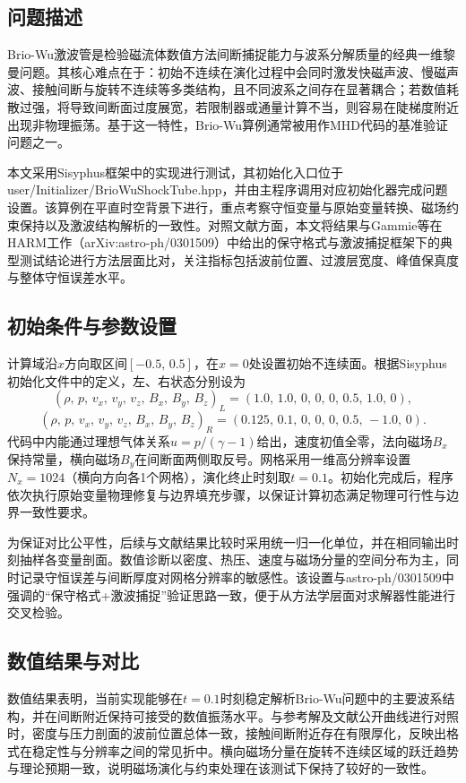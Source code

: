 \subsection{问题描述}
Brio-Wu激波管是检验磁流体数值方法间断捕捉能力与波系分解质量的经典一维黎曼问题。其核心难点在于：初始不连续在演化过程中会同时激发快磁声波、慢磁声波、接触间断与旋转不连续等多类结构，且不同波系之间存在显著耦合；若数值耗散过强，将导致间断面过度展宽，若限制器或通量计算不当，则容易在陡梯度附近出现非物理振荡。基于这一特性，Brio-Wu算例通常被用作MHD代码的基准验证问题之一。

本文采用Sisyphus框架中的实现进行测试，其初始化入口位于user/Initializer/BrioWuShockTube.hpp，并由主程序调用对应初始化器完成问题设置。该算例在平直时空背景下进行，重点考察守恒变量与原始变量转换、磁场约束保持以及激波结构解析的一致性。对照文献方面，本文将结果与Gammie等在HARM工作（arXiv:astro-ph/0301509）中给出的保守格式与激波捕捉框架下的典型测试结论进行方法层面比对，关注指标包括波前位置、过渡层宽度、峰值保真度与整体守恒误差水平。

\subsection{初始条件与参数设置}
计算域沿$x$方向取区间$[-0.5,\,0.5]$，在$x=0$处设置初始不连续面。根据Sisyphus初始化文件中的定义，左、右状态分别设为
\[
(\rho,\,p,\,v_x,\,v_y,\,v_z,\,B_x,\,B_y,\,B_z)_L=(1.0,\,1.0,\,0,\,0,\,0,\,0.5,\,1.0,\,0),
\]
\[
(\rho,\,p,\,v_x,\,v_y,\,v_z,\,B_x,\,B_y,\,B_z)_R=(0.125,\,0.1,\,0,\,0,\,0,\,0.5,\,-1.0,\,0).
\]
代码中内能通过理想气体关系$u=p/(\gamma-1)$给出，速度初值全零，法向磁场$B_x$保持常量，横向磁场$B_y$在间断面两侧取反号。网格采用一维高分辨率设置$N_x=1024$（横向方向各1个网格），演化终止时刻取$t=0.1$。初始化完成后，程序依次执行原始变量物理修复与边界填充步骤，以保证计算初态满足物理可行性与边界一致性要求。

为保证对比公平性，后续与文献结果比较时采用统一归一化单位，并在相同输出时刻抽样各变量剖面。数值诊断以密度、热压、速度与磁场分量的空间分布为主，同时记录守恒误差与间断厚度对网格分辨率的敏感性。该设置与astro-ph/0301509中强调的“保守格式+激波捕捉”验证思路一致，便于从方法学层面对求解器性能进行交叉检验。

\subsection{数值结果与对比}
数值结果表明，当前实现能够在$t=0.1$时刻稳定解析Brio-Wu问题中的主要波系结构，并在间断附近保持可接受的数值振荡水平。与参考解及文献公开曲线进行对照时，密度与压力剖面的波前位置总体一致，接触间断附近存在有限厚化，反映出格式在稳定性与分辨率之间的常见折中。横向磁场分量在旋转不连续区域的跃迁趋势与理论预期一致，说明磁场演化与约束处理在该测试下保持了较好的一致性。

